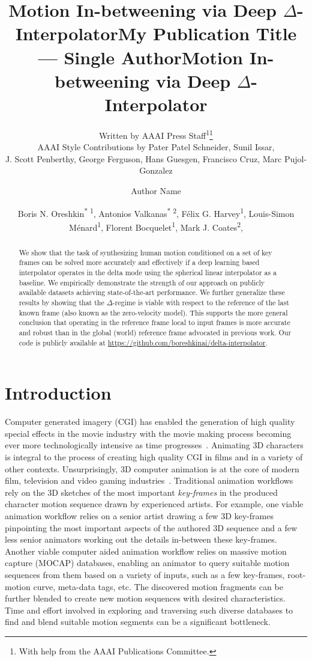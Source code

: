 \documentclass[letterpaper]{article} \usepackage[]{aaai23}  \usepackage{times}  \usepackage{helvet}  \usepackage{courier}  \usepackage[hyphens]{url}  \usepackage{graphicx} \urlstyle{rm} \def\UrlFont{\rm}  \usepackage{natbib}  \usepackage{caption} \frenchspacing  \setlength{\pdfpagewidth}{8.5in} \setlength{\pdfpageheight}{11in}
\title{Motion In-betweening via Deep $\Delta$-Interpolator}
\author{
Written by AAAI Press Staff\textsuperscript{\rm 1}\thanks{With help from the AAAI Publications Committee.}\\
    AAAI Style Contributions by Pater Patel Schneider,
    Sunil Issar,\\
    J. Scott Penberthy,
    George Ferguson,
    Hans Guesgen,
    Francisco Cruz\equalcontrib,
    Marc Pujol-Gonzalez\equalcontrib
}
\title{My Publication Title --- Single Author}
\author {
    Author Name
}
\title{Motion In-betweening via Deep $\Delta$-Interpolator}
\author {
Boris N. Oreshkin\textsuperscript{* \rm 1},
    Antonios Valkanas\textsuperscript{* \rm 2}, 
    Félix G. Harvey\textsuperscript{\rm 1}, 
    Louis-Simon Ménard\textsuperscript{\rm 1}, 
    Florent Bocquelet\textsuperscript{\rm 1}, 
    Mark J. Coates\textsuperscript{\rm 2}, 
}
\begin{document}
\maketitle
\begin{abstract}
We show that the task of synthesizing human motion conditioned on a set of key frames can be solved more accurately and effectively if a deep learning based interpolator operates in the delta mode using the spherical linear interpolator as a baseline. We empirically demonstrate the strength of our approach on publicly available datasets achieving state-of-the-art performance. We further generalize these results by showing that the $\Delta$-regime is viable with respect to the reference of the last known frame (also known as the zero-velocity model). This supports the more general conclusion that operating in the reference frame local to input frames is more accurate and robust than in the global (world) reference frame advocated in previous work. Our code is publicly available at
\url{https://github.com/boreshkinai/delta-interpolator}.
\end{abstract}

\section{Introduction}


Computer generated imagery (CGI) has enabled the generation of high quality special effects in the movie industry with the movie making process becoming ever more technologically intensive as time progresses~\citep{ji2010production}. Animating 3D characters is integral to the process of creating high quality CGI in films and in a variety of other contexts. Unsurprisingly, 3D computer animation is at the core of modern film, television and video gaming industries~\cite{beane20123d}. Traditional animation workflows rely on the 3D sketches of the most important \emph{key-frames} in the produced character motion sequence drawn by experienced artists. For example, one viable animation workflow relies on a senior artist drawing a few 3D key-frames pinpointing the most important aspects of the authored 3D sequence and a few less senior animators working out the details in-between these key-frames. Another viable computer aided animation workflow relies on massive motion capture (MOCAP) databases, enabling an animator to query suitable motion sequences from them based on a variety of inputs, such as a few key-frames, root-motion curve, meta-data tags, etc. The discovered motion fragments can be further blended to create new motion sequences with desired characteristics. Time and effort involved in exploring and traversing such diverse databases to find and blend suitable motion segments can be a significant bottleneck.
\end{document}

